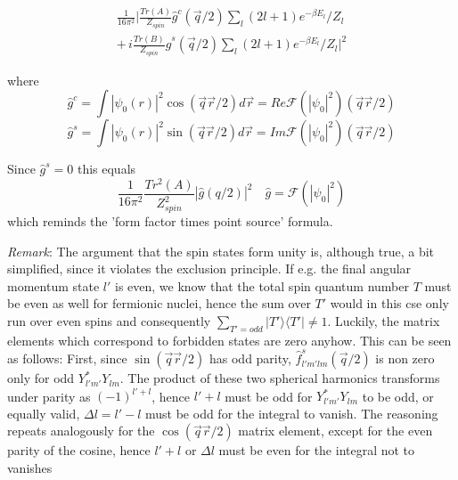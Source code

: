 \documentclass[11pt,a4paper]{article}
\begin{document}
\begin{equation}
\begin{split}
\frac{1}{16 \pi^ 2}
\biggr\rvert
\frac{ Tr(A) }{Z_{spin}} \hat g^c (\vec q /2) \sum_{l} (2l +1)e^{-\beta E_l} /Z_l
\\ + \, i
\frac{ Tr(B) }{Z_{spin}} \hat g^s (\vec q /2) \sum_{l} (2l +1)e^{-\beta E_l} /Z_l
\biggl\lvert ^2
\end{split}
\end{equation}

where 
\begin{equation}
\hat g^c =
\int  
|\psi_{0}(r)|^2  \cos (\vec q \vec r /2)
d \vec r
=
Re \mathcal{F} (|\psi_{0}|^2)(\vec q \vec r /2)
\end{equation}
\begin{equation}
\hat g^s =
\int  
|\psi_{0}(r)|^2  \sin (\vec q \vec r /2)
d \vec r
=
Im \mathcal{F} (|\psi_{0}|^2)(\vec q \vec r /2)
\end{equation}

Since $\hat g^s = 0$ this equals
\begin{equation}
\frac{1}{16 \pi^ 2}
\frac{Tr^2(A) }{Z_{spin}^2 }
|\hat g (q /2)  | ^2    \quad 
\hat g = \mathcal{F} (|\psi_{0}|^2)
\end{equation}
which reminds the 'form factor times point source' formula.





\textit{Remark}: The argument that the spin states form unity is, although true, a bit simplified, since it violates the exclusion principle.
If e.g. the final angular momentum state $l'$ is even, we know that the total spin quantum number $T$ must be even as well
for fermionic nuclei, hence the sum over $T'$ would in this cse only run over even spins and consequently
$\sum_{T'=odd } |T' \rangle \langle  T'| \ne 1 $. Luckily, the matrix elements which
correspond to forbidden states are zero anyhow. This can be seen as follows: First, since $\sin (\vec q \vec r/2)$ has odd
parity, $\hat f^s_{l'm'lm}(\vec q/2)$ is non zero only for odd $Y_{l'm'}^*Y_{lm}$. The product of these two spherical harmonics
transforms under parity as $(-1)^{l' + l}$, hence $l'+l$ must be odd for $Y_{l'm'}^*Y_{lm}$ to be odd, or equally valid,
$\Delta l = l' -l$ must be odd for the integral to vanish. The reasoning repeats analogously for the $\cos(\vec q \vec r/2)$
matrix element, except for the even parity of the cosine, hence $l' + l$ or $\Delta l$ must be even for the integral not to vanishes
\end{document}
